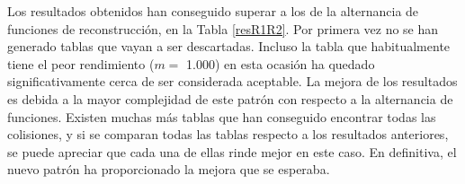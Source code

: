 \documentclass[12pt,spanish,listoffigures,listoftables,listofalgorithms]{tfgetsinf}
\begin{document}
\def\arraystretch{1.5}
\begin{table}[H]
	\LARGE
	\centering
	\caption{Porcentajes de éxito para las tablas empleando el patrón reducido}
	\label{respp}
\end{table}

Los resultados obtenidos han conseguido superar a los de la alternancia de funciones de reconstrucción, en la Tabla \ref{resR1R2}. Por primera vez no se han generado tablas que vayan a ser descartadas. Incluso la tabla que habitualmente tiene el peor rendimiento ($m =$ 1.000) en esta ocasión ha quedado significativamente cerca de ser considerada aceptable. La mejora de los resultados es debida a la mayor complejidad de este patrón con respecto a la alternancia de funciones. Existen muchas más tablas que han conseguido encontrar todas las colisiones, y si se comparan todas las tablas respecto a los resultados anteriores, se puede apreciar que cada una de ellas rinde mejor en este caso. En definitiva, el nuevo patrón ha proporcionado la mejora que se esperaba.
\end{document}
